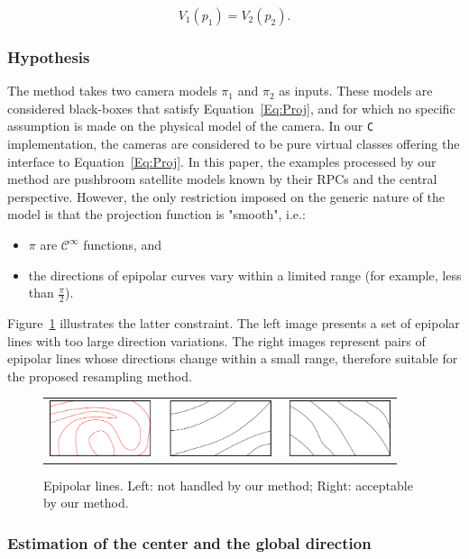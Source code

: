 \documentclass{ipol}
\newcommand{\CPP}{\mbox{\tt C\hspace{-0.05cm}\raisebox{0.2ex}{\small ++} }}
\begin{document}
\begin{equation}
    V_1(p_1) = V_2(p_2) \label{EqV1V2}.
\end{equation}

\subsubsection{Hypothesis}


The method takes two camera models $\pi_1$ and $\pi_2$ as inputs.
These models are considered black-boxes that satisfy Equation~\eqref{Eq:Proj}, and for which no specific assumption is made on the physical model of the camera. In our \CPP implementation,
the cameras are considered to be pure virtual classes offering the interface to Equation~\eqref{Eq:Proj}.
In this paper, the examples processed by our method are pushbroom satellite models known by their RPCs and the central perspective. However, the only restriction imposed on the generic nature of the model is that the projection function is "smooth", i.e.:

\begin{itemize}
    \item $\pi$ are $\mathcal{C}^{\infty}$ functions, and
    \item the directions of epipolar curves vary within a limited range (for example,
          less than $\frac{\pi}{2}$).
\end{itemize}
%
Figure~\ref{BadGoodEpip} illustrates the latter constraint. The left image presents a set
of epipolar lines with too large direction variations. The right images represent  pairs of epipolar lines whose directions change within a small range, therefore suitable for the proposed resampling method. 
%
\begin{figure}[h!]
\centering
\begin{tabular}{c}
\includegraphics[width=10cm]{FIGS/BadGoodLines.png}
\end{tabular}
\caption{Epipolar lines. Left: not handled by our method; Right: acceptable by our method.}
\label{BadGoodEpip}
\end{figure}


\subsubsection{Estimation of the center and the global direction}
\end{document}
